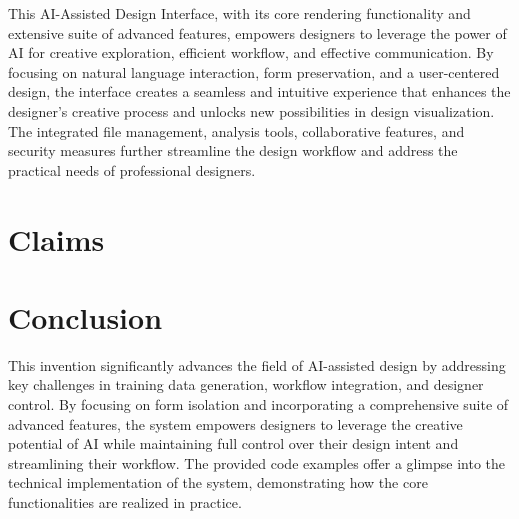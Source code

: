 \documentclass{article}
\begin{document}
This AI-Assisted Design Interface, with its core rendering functionality and extensive suite of advanced features, empowers designers to leverage the power of AI for creative exploration, efficient workflow, and effective communication. By focusing on natural language interaction, form preservation, and a user-centered design, the interface creates a seamless and intuitive experience that enhances the designer's creative process and unlocks new possibilities in design visualization. The integrated file management, analysis tools, collaborative features, and security measures further streamline the design workflow and address the practical needs of professional designers.

\section{Claims}

\section{Conclusion}

This invention significantly advances the field of AI-assisted design by addressing key challenges in training data generation, workflow integration, and designer control. By focusing on form isolation and incorporating a comprehensive suite of advanced features, the system empowers designers to leverage the creative potential of AI while maintaining full control over their design intent and streamlining their workflow. The provided code examples offer a glimpse into the technical implementation of the system, demonstrating how the core functionalities are realized in practice. 
\end{document}
